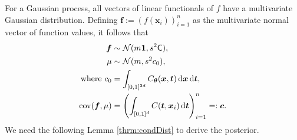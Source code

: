 \documentclass[twocolumn]{svjour3}          %
\newcommand{\bm}[1]{\boldsymbol{#1}}
\newcommand{\dif}[1]{\text{d}{#1}}
\newcommand{\D}[1]{\text{d}{#1}}
\newcommand{\vtheta}{{\bm{\theta}}}
\newcommand{\vc}{\bm{c}}
\newcommand{\vf}{\bm{f}}
\newcommand{\vt}{\bm{t}}
\newcommand{\vx}{\bm{x}}
\newcommand{\vone}{\bm{1}}
\newcommand{\mC}{\mathsf{C}}
\newcommand{\cov}{{\textup{cov}}}
\newcommand{\calN}{\mathcal{N}}
\begin{document}
For a Gaussian process, all vectors of linear functionals of $f$ have a multivariate Gaussian distribution. Defining  $\vf  := \left( f(\vx_i)\right)_{i=1}^n$ as the multivariate normal vector of function values, it follows that 
\begin{subequations} \label{eqn:fGaussDist}
\begin{align}
\vf  & \sim \calN(m \vone, s^2 \mC), \\
\mu & \sim \calN(m, s^2 c_0), 
\\
\text{where }
c_0 &= \int_{[0,1]^{2d}} C_\vtheta(\vx,\vt) \, \dif{\vx} \, \dif{\vt}, \\
\cov(\vf, \mu) &= \left(  \int_{[0,1]^d} C(\vt,\vx_i) \, \D \vt \right)_{i=1}^n  =: \vc.
\end{align}
\end{subequations}
We need the following Lemma \ref{thrm:condDist} to derive the posterior.
\end{document}
